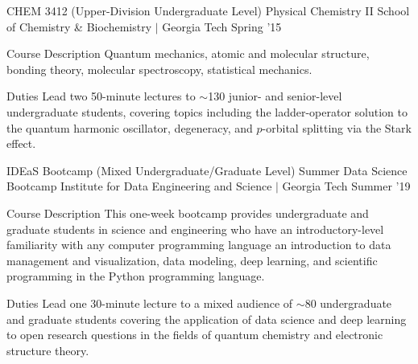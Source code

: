 \begin{cventries}
  \cvteachingentry
    {CHEM 3412 (Upper-Division Undergraduate Level)} %
    {Physical Chemistry II} %
    {School of Chemistry \& Biochemistry $\vert$ Georgia Tech} %
    {Spring '15} %
    {%
    \begin{cvdescription}
    \item[Course Description] Quantum mechanics, atomic and molecular structure, bonding
        theory, molecular spectroscopy, statistical mechanics. 
    \item[Duties] Lead two 50-minute lectures to $\sim$130 junior- and senior-level 
        undergraduate students, covering topics including the ladder-operator solution
        to the quantum harmonic oscillator, degeneracy, and $p$-orbital splitting via the
        Stark effect.
    \end{cvdescription}
    }

  \cvteachingentry
    {IDEaS Bootcamp (Mixed Undergraduate/Graduate Level)} %
    {Summer Data Science Bootcamp} %
    {Institute for Data Engineering and Science $\vert$ Georgia Tech} %
    {Summer '19} %
    {%
    \begin{cvdescription}
    \item[Course Description] This one-week bootcamp provides undergraduate and graduate
        students in science and engineering who have an introductory-level familiarity 
        with any computer programming language an introduction to data management and 
        visualization, data modeling, deep learning, and scientific programming in the
        Python programming language.
    \item[Duties] Lead one 30-minute lecture to a mixed audience of $\sim$80
        undergraduate and graduate students covering the application of data science and
        deep learning to open research questions in the fields of quantum chemistry and 
        electronic structure theory.
    \end{cvdescription}
    }


\end{cventries}
